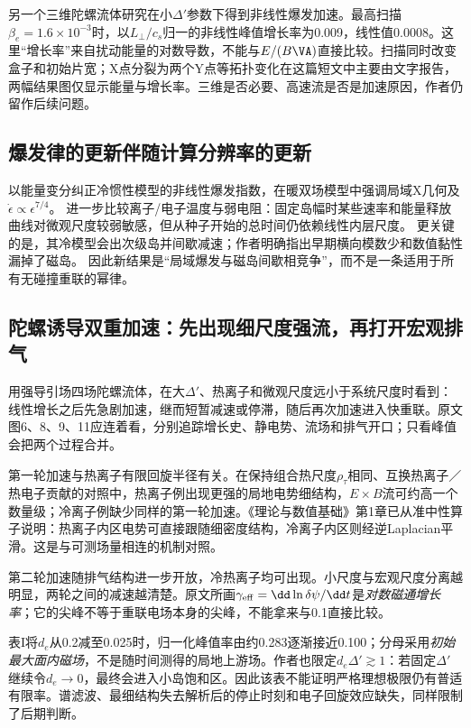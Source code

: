 \documentclass[UTF8,a4paper,11pt,openany,fontset=fandol]{ctexbook}
\begin{document}
另一个三维陀螺流体研究在小$\Delta'$参数下得到非线性爆发加速。最高扫描$\beta_e=1.6\times10^{-3}$时，以$L_\perp/c_s$归一的非线性峰值增长率为0.009，线性值0.0008。这里“增长率”来自扰动能量的对数导数，不能与$E/(B\VA)$直接比较。扫描同时改变盒子和初始片宽；X点分裂为两个Y点等拓扑变化在这篇短文中主要由文字报告，两幅结果图仅显示能量与增长率。三维是否必要、高速流是否是加速原因，作者仍留作后续问题。\citep{L184}

\subsection{爆发律的更新伴随计算分辨率的更新}
\citet{L191}以能量变分纠正冷惯性模型的非线性爆发指数，\citet{L214}在暖双场模型中强调局域X几何及$\dot\epsilon\propto\epsilon^{7/4}$。
\citet{F697}进一步比较离子/电子温度与弱电阻：固定岛幅时某些速率和能量释放曲线对微观尺度较弱敏感，但从种子开始的总时间仍依赖线性内层尺度。
更关键的是，其冷模型会出次级岛并间歇减速；作者明确指出早期横向模数少和数值黏性漏掉了磁岛。
因此新结果是“局域爆发与磁岛间歇相竞争”，而不是一条适用于所有无碰撞重联的幂律。

\subsection{陀螺诱导双重加速：先出现细尺度强流，再打开宏观排气}
\citet{F672}用强导引场四场陀螺流体，在大$\Delta'$、热离子和微观尺度远小于系统尺度时看到：线性增长之后先急剧加速，继而短暂减速或停滞，随后再次加速进入快重联。原文图6、8、9、11应连着看，分别追踪增长史、静电势、流场和排气开口；只看峰值会把两个过程合并。

第一轮加速与热离子有限回旋半径有关。在保持组合热尺度$\rho_\tau$相同、互换热离子／热电子贡献的对照中，热离子例出现更强的局地电势细结构，$E\times B$流可约高一个数量级；冷离子例缺少同样的第一轮加速。《理论与数值基础》第1章已从准中性算子说明：热离子内区电势可直接跟随细密度结构，冷离子内区则经逆Laplacian平滑。这是与可测场量相连的机制对照。

第二轮加速随排气结构进一步开放，冷热离子均可出现。小尺度与宏观尺度分离越明显，两轮之间的减速越清楚。原文所画$\gamma_{\rm eff}=\dd\ln\delta\psi/\dd t$是\emph{对数磁通增长率}；它的尖峰不等于重联电场本身的尖峰，不能拿来与0.1直接比较。

表I将$d_e$从0.2减至0.025时，归一化峰值率由约0.283逐渐接近0.100；分母采用\emph{初始最大面内磁场}，不是随时间测得的局地上游场。作者也限定$d_e\Delta'\gtrsim1$：若固定$\Delta'$继续令$d_e\to0$，最终会进入小岛饱和区。因此该表不能证明严格理想极限仍有普适有限率。谱滤波、最细结构失去解析后的停止时刻和电子回旋效应缺失，同样限制了后期判断。
\end{document}
